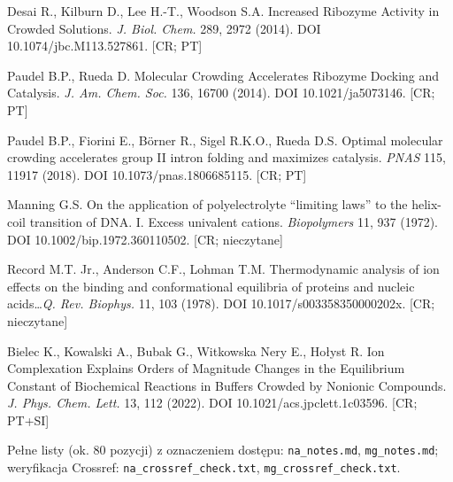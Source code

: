 \documentclass[11pt,a4paper]{article}
\begin{document}
\begin{enumerate}[label={[\arabic*]},ref={\arabic*},leftmargin=*,itemsep=0pt]
\item\label{b:desai} Desai R., Kilburn D., Lee H.-T., Woodson S.A. Increased Ribozyme Activity in Crowded Solutions. \emph{J. Biol. Chem.} 289, 2972 (2014). DOI 10.1074/jbc.M113.527861. [CR; PT]
\item\label{b:pau14} Paudel B.P., Rueda D. Molecular Crowding Accelerates Ribozyme Docking and Catalysis. \emph{J. Am. Chem. Soc.} 136, 16700 (2014). DOI 10.1021/ja5073146. [CR; PT]
\item\label{b:pau18} Paudel B.P., Fiorini E., Börner R., Sigel R.K.O., Rueda D.S. Optimal molecular crowding accelerates group II intron folding and maximizes catalysis. \emph{PNAS} 115, 11917 (2018). DOI 10.1073/pnas.1806685115. [CR; PT]
\item\label{b:mann72} Manning G.S. On the application of polyelectrolyte ``limiting laws'' to the helix-coil transition of DNA. I. Excess univalent cations. \emph{Biopolymers} 11, 937 (1972). DOI 10.1002/bip.1972.360110502. [CR; nieczytane]
\item\label{b:rec78} Record M.T. Jr., Anderson C.F., Lohman T.M. Thermodynamic analysis of ion effects on the binding and conformational equilibria of proteins and nucleic acids\ldots \emph{Q. Rev. Biophys.} 11, 103 (1978). DOI 10.1017/s003358350000202x. [CR; nieczytane]
\item\label{b:bielec22} Bielec K., Kowalski A., Bubak G., Witkowska Nery E., Hołyst R. Ion Complexation Explains Orders of Magnitude Changes in the Equilibrium Constant of Biochemical Reactions in Buffers Crowded by Nonionic Compounds. \emph{J. Phys. Chem. Lett.} 13, 112 (2022). DOI 10.1021/acs.jpclett.1c03596. [CR; PT+SI]
\end{enumerate}
Pełne listy (ok. 80 pozycji) z oznaczeniem dostępu: \texttt{na\_notes.md}, \texttt{mg\_notes.md}; weryfikacja Crossref: \texttt{na\_crossref\_check.txt}, \texttt{mg\_crossref\_check.txt}.
\end{document}
